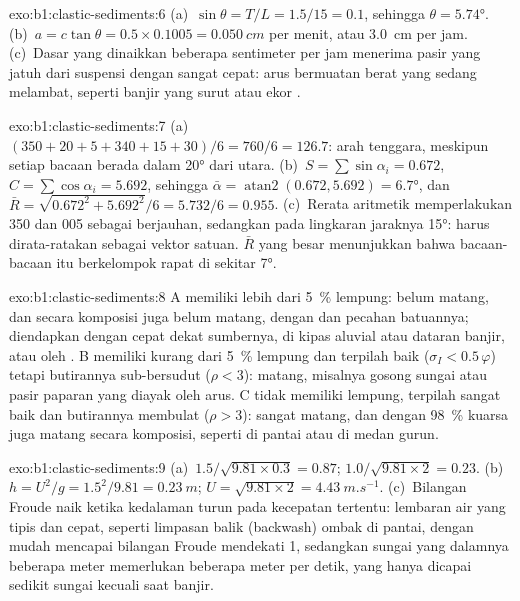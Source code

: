 \begin{solution}{exo:b1:clastic-sediments:6}
(a)~$\sin\theta = T/L = 1.5/15 = 0.1$, sehingga $\theta = \ang{5.74}$. (b)~$a =
c\tan\theta = 0.5 \times 0.1005 = \qty{0.050}{cm}$ per menit, atau
\qty{3.0}{cm} per jam. (c)~Dasar yang dinaikkan beberapa sentimeter per jam menerima pasir yang jatuh dari suspensi dengan sangat cepat: arus bermuatan berat yang sedang melambat, seperti banjir yang surut atau ekor .
\end{solution}

\begin{solution}{exo:b1:clastic-sediments:7}
(a)~$(350 + 20 + 5 + 340 + 15 + 30)/6 = 760/6 = 126.7$: arah tenggara,
meskipun setiap bacaan berada dalam \ang{20} dari utara. (b)~$S =
\sum\sin\alpha_i = 0.672$, $C = \sum\cos\alpha_i = 5.692$, sehingga $\bar\alpha =
\operatorname{atan2}(0.672, 5.692) = \ang{6.7}$, dan $\bar R =
\sqrt{0.672^2 + 5.692^2}/6 = 5.732/6 = 0.955$. (c)~Rerata aritmetik memperlakukan
350 dan 005 sebagai berjauhan, sedangkan pada lingkaran jaraknya \ang{15}: 
harus dirata-ratakan sebagai vektor satuan. $\bar R$ yang besar menunjukkan bahwa
bacaan-bacaan itu berkelompok rapat di sekitar \ang{7}.
\end{solution}

\begin{solution}{exo:b1:clastic-sediments:8}
A memiliki lebih dari \qty{5}{\percent} lempung: belum matang, dan secara komposisi juga belum matang, dengan  dan pecahan batuannya; diendapkan dengan cepat dekat sumbernya, di kipas aluvial atau dataran banjir, atau oleh . B memiliki kurang dari \qty{5}{\percent} lempung dan terpilah baik ($\sigma_I < 0.5\,\varphi$) tetapi butirannya sub-bersudut ($\rho < 3$): matang, misalnya gosong sungai atau pasir paparan yang diayak oleh arus. C tidak memiliki lempung, terpilah sangat baik dan butirannya membulat ($\rho > 3$): sangat matang, dan dengan \qty{98}{\percent} kuarsa juga matang secara komposisi, seperti di pantai atau di medan  gurun.
\end{solution}

\begin{solution}{exo:b1:clastic-sediments:9}
(a)~$1.5/\sqrt{9.81 \times 0.3} = 0.87$; $1.0/\sqrt{9.81 \times 2} = 0.23$.
(b)~$h = U^2/g = 1.5^2/9.81 = \qty{0.23}{m}$; $U = \sqrt{9.81 \times 2} =
\qty{4.43}{m.s^{-1}}$. (c)~Bilangan Froude naik ketika kedalaman turun pada kecepatan tertentu: lembaran air yang tipis dan cepat, seperti limpasan balik (backwash) ombak di pantai, dengan mudah mencapai bilangan Froude mendekati 1, sedangkan sungai yang dalamnya beberapa meter memerlukan beberapa meter per detik, yang hanya dicapai sedikit sungai kecuali saat banjir.
\end{solution}

